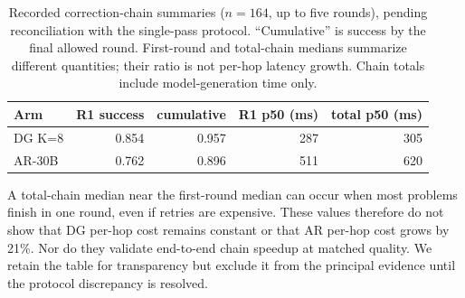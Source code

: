 \begin{table}[h]
\centering
\caption{Recorded correction-chain summaries ($n{=}164$, up to five
rounds), pending reconciliation with the single-pass protocol. ``Cumulative''
is success by the final allowed round. First-round and total-chain
medians summarize different quantities; their ratio is not per-hop
latency growth. Chain totals include model-generation time only.}
\label{tab:chain}
\begin{tabular}{@{}lrrrr@{}}
\toprule
Arm & R1 success & cumulative & R1 p50 (ms) & total p50 (ms) \\
\midrule
DG K=8  & 0.854 & 0.957 & 287 & 305 \\
AR-30B  & 0.762 & 0.896 & 511 & 620 \\
\bottomrule
\end{tabular}
\end{table}

A total-chain median near the first-round median can occur when most
problems finish in one round, even if retries are expensive. These values
therefore do not show that DG per-hop cost remains constant or that AR
per-hop cost grows by 21\%. Nor do they validate end-to-end chain speedup
at matched quality. We retain the table for transparency but exclude it
from the principal evidence until the protocol discrepancy is resolved.
